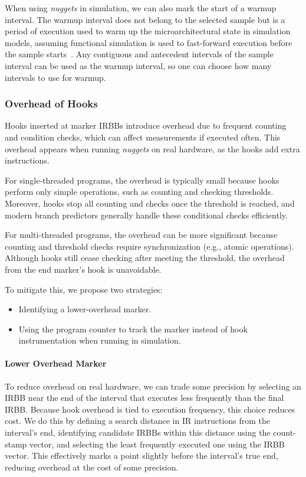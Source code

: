When using \emph{nuggets} in simulation, we can also mark the start of a warmup interval.
The warmup interval does not belong to the selected sample but is a period of execution used to warm up the microarchitectural state in simulation models, assuming functional simulation is used to fast-forward execution before the sample starts~\cite{ComputerArchitecturePerformanceEvaluationMethods}.
Any contiguous and antecedent intervals of the sample interval can be used as the warmup interval, so one can choose how many intervals to use for warmup.

\subsubsection{Overhead of Hooks}\label{sec:overhead_of_hooks}

Hooks inserted at marker IRBBs introduce overhead due to frequent counting and condition checks, which can affect measurements if executed often.
This overhead appears when running \emph{nuggets} on real hardware, as the hooks add extra instructions.

For single-threaded programs, the overhead is typically small because hooks perform only simple operations, such as counting and checking thresholds.
Moreover, hooks stop all counting and checks once the threshold is reached, and modern branch predictors generally handle these conditional checks efficiently.

For multi-threaded programs, the overhead can be more significant because counting and threshold checks require synchronization (e.g., atomic operations).
Although hooks still cease checking after meeting the threshold, the overhead from the end marker's hook is unavoidable.

To mitigate this, we propose two strategies:
\begin{itemize}
    \item Identifying a lower-overhead marker.
    \item Using the program counter to track the marker instead of hook instrumentation when running in simulation.
\end{itemize}

\paragraph*{Lower Overhead Marker}

To reduce overhead on real hardware, we can trade some precision by selecting an IRBB near the end of the interval that executes less frequently than the final IRBB.
Because hook overhead is tied to execution frequency, this choice reduces cost.
We do this by defining a search distance in IR instructions from the interval's end, identifying candidate IRBBs within this distance using the count-stamp vector, and selecting the least frequently executed one using the IRBB vector.
This effectively marks a point slightly before the interval's true end, reducing overhead at the cost of some precision.


